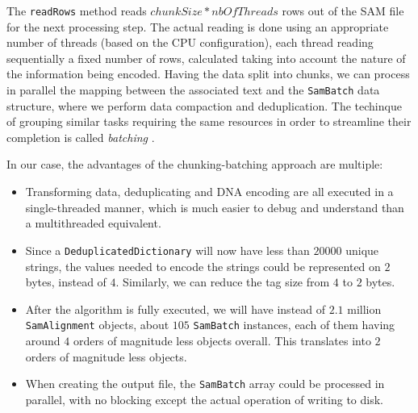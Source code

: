 \documentclass[a4paper,twoside]{article}
\begin{document}
The {\texttt{readRows} } method reads $chunkSize * nbOfThreads$ rows out of the SAM file for the next processing step.
The actual reading is done using an appropriate number of threads (based on the CPU configuration), each thread reading sequentially a fixed number of rows, calculated taking into account the nature of the information being encoded.
Having the data split into chunks, we can process in parallel the mapping between the associated text and the {\texttt{SamBatch} } data structure, where we perform data compaction and deduplication.
The techinque of grouping similar tasks requiring the same resources in order to streamline their completion is called {\textit{batching} }.

In our case, the advantages of the chunking-batching approach are multiple:
\begin{itemize}
\item Transforming data, deduplicating and DNA encoding are all executed in a single-threaded manner, which is much easier to debug and understand than a multithreaded equivalent.

\item Since a {\texttt{DeduplicatedDictionary} } will now have less than $20000$ unique strings, the values needed to encode the strings could be represented on $2$ bytes, instead of $4$.
Similarly, we can reduce the tag size from $4$ to $2$ bytes.

\item After the algorithm is fully executed,  we will have instead of $2.1$ million {\texttt{SamAlignment} } objects, about $105$ {\texttt{SamBatch} } instances, each of them having around $4$ orders of magnitude less objects overall.
This translates into $2$ orders of magnitude less objects.

\item When creating the output file, the {\texttt{SamBatch} } array could be processed in parallel, with no blocking except the actual operation of writing to disk.
\end{itemize}
\end{document}
